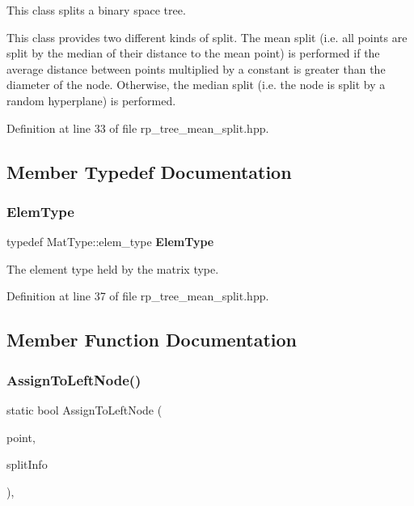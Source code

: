 This class splits a binary space tree. 

This class provides two different kinds of split. The mean split (i.\+e. all points are split by the median of their distance to the mean point) is performed if the average distance between points multiplied by a constant is greater than the diameter of the node. Otherwise, the median split (i.\+e. the node is split by a random hyperplane) is performed. 

Definition at line 33 of file rp\+\_\+tree\+\_\+mean\+\_\+split.\+hpp.



\subsection{Member Typedef Documentation}
\mbox{\label{classmlpack_1_1tree_1_1RPTreeMeanSplit_a227d0c7e23e98fcd6c81ecab357a791f}} 
\subsubsection{Elem\+Type}
{\footnotesize\ttfamily typedef Mat\+Type\+::elem\+\_\+type \textbf{ Elem\+Type}}



The element type held by the matrix type. 



Definition at line 37 of file rp\+\_\+tree\+\_\+mean\+\_\+split.\+hpp.



\subsection{Member Function Documentation}
\mbox{\label{classmlpack_1_1tree_1_1RPTreeMeanSplit_af0fc61f469596cb8796d1966564ecbcb}} 
\subsubsection{Assign\+To\+Left\+Node()}
{\footnotesize\ttfamily static bool Assign\+To\+Left\+Node (\begin{DoxyParamCaption}\item[{const Vec\+Type \&}]{point,  }\item[{const \textbf{ Split\+Info} \&}]{split\+Info }\end{DoxyParamCaption})\hspace{0.3cm}{\ttfamily [inline]}, {\ttfamily [static]}}



